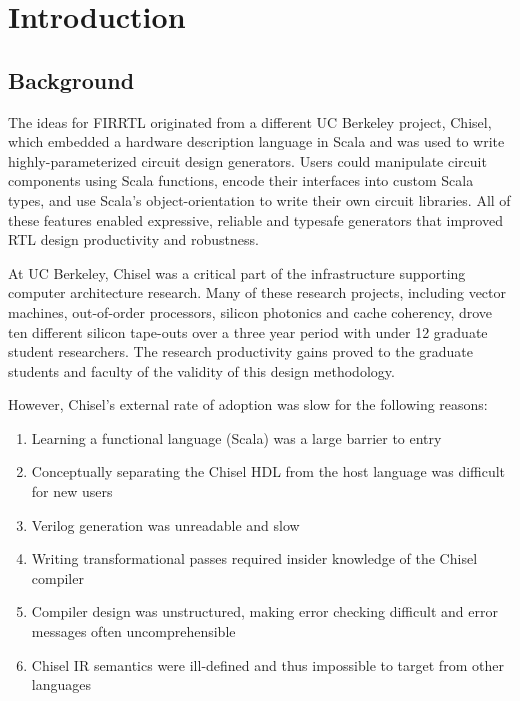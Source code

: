 \documentclass[12pt]{article}
\begin{document}
\maketitle
\tableofcontents
\newpage


\section{Introduction}

\subsection{Background}
The ideas for FIRRTL originated from a different UC Berkeley project, Chisel, which embedded a hardware description language in Scala and was used to write highly-parameterized circuit design generators.
Users could manipulate circuit components using Scala functions, encode their interfaces into custom Scala types, and use Scala's object-orientation to write their own circuit libraries.
All of these features enabled expressive, reliable and typesafe generators that improved RTL design productivity and robustness.

At UC Berkeley, Chisel was a critical part of the infrastructure supporting computer architecture research.
Many of these research projects, including vector machines, out-of-order processors, silicon photonics and cache coherency, drove ten different silicon tape-outs over a three year period with under 12 graduate student researchers.
The research productivity gains proved to the graduate students and faculty of the validity of this design methodology.

However, Chisel's external rate of adoption was slow for the following reasons:
\begin{enumerate}[topsep=3pt,itemsep=-0.5ex,partopsep=1ex,parsep=1ex]
\item Learning a functional language (Scala) was a large barrier to entry
\item Conceptually separating the Chisel HDL from the host language was difficult for new users
\item Verilog generation was unreadable and slow
\item Writing transformational passes required insider knowledge of the Chisel compiler
\item Compiler design was unstructured, making error checking difficult and error messages often uncomprehensible
\item Chisel IR semantics were ill-defined and thus impossible to target from other languages
\end{enumerate}
\end{document}
